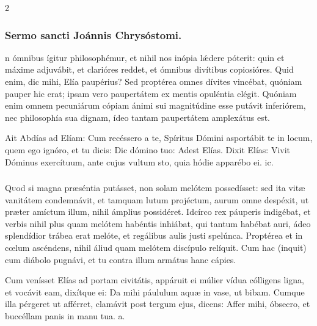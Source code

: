 \documentclass[9pt,twoside]{extarticle}
\begin{document}
\begin{multicols}{2}
\subsubsection*{\center Sermo sancti Joánnis Chrysóstomi.}
\begin{center}\end{center}
n ómnibus ígitur philosophémur, et nihil nos inópia lǽdere póterit: quin et máxime adjuvábit, et clarióres reddet, et ómnibus divítibus copiosióres. Quid enim, dic mihi, Elía paupérius? Sed proptérea omnes dívites vincébat, quóniam pauper hic erat; ipsam vero paupertátem ex mentis opuléntia elégit. Quóniam enim omnem pecuniárum cópiam ánimi sui magnitúdine esse putávit inferiórem, nec philosophía sua dignam, ídeo tantam paupertátem amplexátus est.

\begin{tightlist}{}
\item {} Ait Abdías ad Elíam: Cum recéssero a te, Spíritus Dómini asportábit te in locum, quem ego ignóro, et tu dicis: \textred{*} Dic dómino tuo: Adest Elías.  Dixit Elías: Vivit Dóminus exercítuum, ante cujus vultum sto, quia hódie apparébo ei. ic.
\end{tightlist}

\subsubsection*{\center {}}
\lettrine{Q}uod si magna præséntia putásset, non solam melótem possedísset: sed ita vitæ vanitátem condemnávit, et tamquam lutum projéctum, aurum omne despéxit, ut præter amíctum illum, nihil ámplius possidéret. Idcírco rex páuperis indigébat, et verbis nihil plus quam melótem habéntis inhiábat, qui tantum habébat auri, ádeo splendídior trábea erat melóte, et regálibus aulis justi spelúnca. Proptérea et in cœlum ascéndens, nihil áliud quam melótem discípulo relíquit. Cum hac (inquit) cum diábolo pugnávi, et tu contra illum armátus hanc cápies.

\begin{tightlist}{}
\item {} Cum venísset Elías ad portam civitátis, appáruit ei múlier vídua cólligens ligna, et vocávit eam, dixítque ei: \textred{*} Da mihi páululum aquæ in vase, ut bibam.  Cumque illa pérgeret ut afférret, clamávit post tergum ejus, dicens: Affer mihi, óbsecro, et buccéllam panis in manu tua. a.
\end{tightlist}


\end{multicols}
\end{document}
